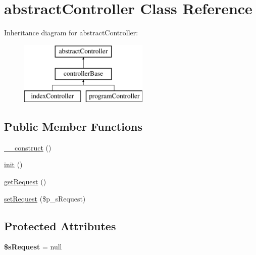 \hypertarget{classabstract_controller}{\section{abstract\-Controller Class Reference}
\label{classabstract_controller}
}
Inheritance diagram for abstract\-Controller\-:\begin{figure}[H]
\begin{center}
\leavevmode
\includegraphics[height=3.000000cm]{classabstract_controller}
\end{center}
\end{figure}
\subsection*{Public Member Functions}
\begin{DoxyCompactItemize}
\item 
\hyperlink{classabstract_controller_a095c5d389db211932136b53f25f39685}{\-\_\-\-\_\-construct} ()
\item 
\hyperlink{classabstract_controller_a4be4055f3361d4800e16bc2e2e38cda6}{init} ()
\item 
\hyperlink{classabstract_controller_adf1a35ad20e475c59cc0967d5764aa22}{get\-Request} ()
\item 
\hyperlink{classabstract_controller_a346a92c94dc686c7217f35a078b5a54f}{set\-Request} (\$p\-\_\-s\-Request)
\end{DoxyCompactItemize}
\subsection*{Protected Attributes}
\begin{DoxyCompactItemize}
\item 
\hypertarget{classabstract_controller_a815262d9bd8ab6e610f85e2b45bb13ec}{{\bfseries \$s\-Request} = null}\label{classabstract_controller_a815262d9bd8ab6e610f85e2b45bb13ec}

\end{DoxyCompactItemize}


